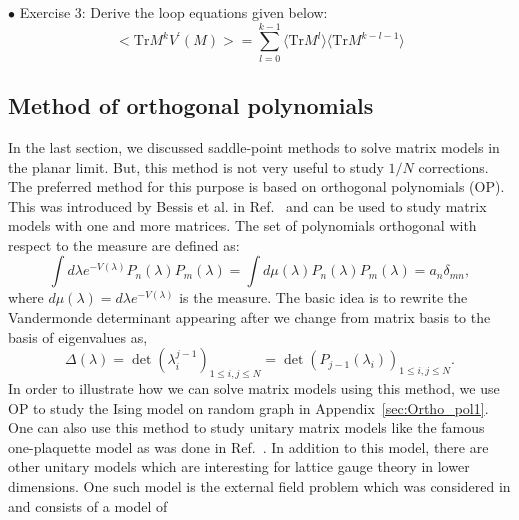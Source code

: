 \documentclass[letter,11pt]{article}
\begin{document}
\begin{mdframed}[backgroundcolor=blue!3] 
	$\bullet$ Exercise 3: Derive the loop equations given below: \\ 
	\begin{equation}
		\label{eq:LE1} 
		\Big< \mbox{Tr} M^{k} V^{\prime}(M) \Big> = \sum_{l=0}^{k-1} \langle \mbox{Tr} M^{l} \rangle  \langle \mbox{Tr} M^{k-l-1} \rangle
	\end{equation} 
\end{mdframed}

\vspace{4mm} 

\subsection{\label{subsec:OP}Method of orthogonal polynomials}
In the last section, we discussed saddle-point methods to solve matrix models in the planar limit. 
But, this method is not very useful to study $1/N$ corrections. The preferred method for this purpose is based on orthogonal polynomials (OP). 
This was introduced by Bessis et al. in Ref.~\cite{Bessis:1980ss} and can be used to study matrix models with one and more matrices. 
The set of polynomials orthogonal with respect to the measure are defined as:
\begin{equation}
	\label{eq:ortho_nn} 
	\int d\lambda e^{-V(\lambda)} P_{n}(\lambda)
	P_{m}(\lambda) = \int d \mu(\lambda) P_{n}(\lambda)
	P_{m}(\lambda) = a_{n} \delta_{mn} ,
\end{equation}
where $d \mu(\lambda) = d\lambda e^{-V(\lambda)}$ is the measure. 
The basic idea is to rewrite the Vandermonde determinant appearing after we change from matrix basis to the basis of eigenvalues as, 
\begin{equation}
	\Delta(\lambda) = \det(\lambda_{i}^{j-1})_{1 \le i, j \le N} = \det(P_{j-1}(\lambda_i))_{1 \le i, j \le N}. 
\end{equation}
In order to illustrate how we can solve matrix models using this method, we use OP to study the Ising model on random graph in 
Appendix~\ref{sec:Ortho_pol1}. One can also use this method to study unitary matrix models like the 
famous one-plaquette model \cite{Gross:1980he,Wadia:2012fr}
as was done in Ref.~\cite{Goldschmidt:1979hq}. In addition to this model, 
there are other unitary models which are interesting 
for lattice gauge theory in lower dimensions. 
One such model is the external field problem which was considered in \cite{Brezin:1980rk} and consists of a model of 
\end{document}
